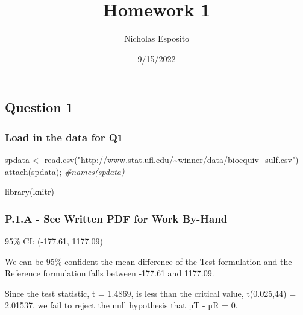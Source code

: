 \documentclass[
]{article}
\title{Homework 1}
\author{Nicholas Esposito}
\date{9/15/2022}
\newenvironment{Shaded}{\begin{snugshade}}{\end{snugshade}}
\newcommand{\CommentTok}[1]{\textcolor[rgb]{0.56,0.35,0.01}{\textit{#1}}}
\newcommand{\FunctionTok}[1]{\textcolor[rgb]{0.00,0.00,0.00}{#1}}
\newcommand{\NormalTok}[1]{#1}
\newcommand{\OtherTok}[1]{\textcolor[rgb]{0.56,0.35,0.01}{#1}}
\newcommand{\StringTok}[1]{\textcolor[rgb]{0.31,0.60,0.02}{#1}}
\begin{document}
\maketitle

\hypertarget{question-1}{%
\subsection{Question 1}\label{question-1}}

\hypertarget{load-in-the-data-for-q1}{%
\subsubsection{Load in the data for Q1}\label{load-in-the-data-for-q1}}

\begin{Shaded}
\begin{Highlighting}[]
\NormalTok{spdata }\OtherTok{\textless{}{-}} \FunctionTok{read.csv}\NormalTok{(}\StringTok{"http://www.stat.ufl.edu/\textasciitilde{}winner/data/bioequiv\_sulf.csv"}\NormalTok{)}
\FunctionTok{attach}\NormalTok{(spdata); }\CommentTok{\#names(spdata)}

\FunctionTok{library}\NormalTok{(knitr)}
\end{Highlighting}
\end{Shaded}

\hypertarget{p.1.a---see-written-pdf-for-work-by-hand}{%
\subsubsection{P.1.A - See Written PDF for Work
By-Hand}\label{p.1.a---see-written-pdf-for-work-by-hand}}

95\% CI: (-177.61, 1177.09)

We can be 95\% confident the mean difference of the Test formulation and
the Reference formulation falls between -177.61 and 1177.09.

Since the test statistic, t = 1.4869, is less than the critical value,
t(0.025,44) = 2.01537, we fail to reject the null hypothesis that µT -
µR = 0.
\end{document}
